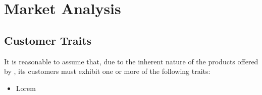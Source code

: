 \section{Market Analysis}
\subsection{Customer Traits}
It is reasonable to assume that, due to the inherent nature of the products offered by \fw, its customers must
exhibit one or more of the following traits:
\begin{itemize}
	\item Lorem
\end{itemize}
